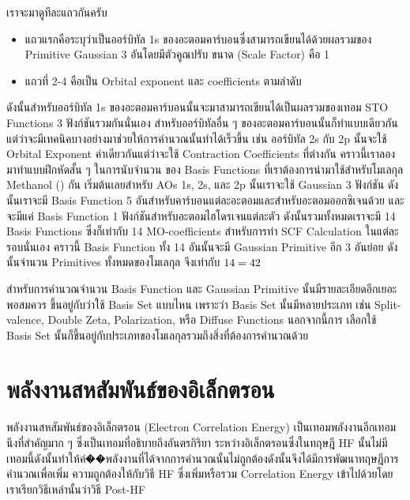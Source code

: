 เราจะมาดูทีละแถวกันครับ

\begin{itemize}[topsep=0pt,noitemsep]
  \setlength\itemsep{1em}
  \item แถวแรกคือระบุว่าเป็นออร์บิทัล 1s ของอะตอมคาร์บอนซึ่งสามารถเขียนได้ด้วยผลรวมของ Primitive Gaussian 3 อันโดยมีตัวคูณปรับ%
        ขนาด (Scale Factor) คือ 1

  \item แถวที่ 2-4 คือเป็น Orbital exponent และ  coefficients ตามลำดับ
\end{itemize}

\noindent ดังนั้นสำหรับออร์บิทัล 1s ของอะตอมคาร์บอนนั้นจะมาสามารถเขียนได้เป็นผลรวมของเทอม STO Functions 3 ฟังก์ชันรวมกันนั่นเอง
สำหรับออร์บิทัลอื่น ๆ ของอะตอมคาร์บอนนั้นก็ทำแบบเดียวกันแต่ว่าจะมีเทคนิคบางอย่างมาช่วยให้การคำนวณนั้นทำได้เร็วขึ้น เช่น ออร์บิทัล 2s กับ 2p
นั้นจะใช้ Orbital Exponent ค่าเดียวกันแต่ว่าจะใช้ Contraction Coefficients ที่ต่างกัน คราวนี้เราลองมาทำแบบฝึกหัดสั้น ๆ ในการนับจำนวน%
ของ Basis Functions ที่เราต้องการนำมาใช้สำหรับโมเลกุล Methanol () กัน เริ่มต้นเลยสำหรับ AOs 1s, 2s, และ 2p นั้นเราจะใช้
Gaussian 3 ฟังก์ชัน ดังนั้นเราจะมี Basis Function 5 อันสำหรับคาร์บอนแต่ละอะตอมและสำหรับอะตอมออกซิเจนด้วย และจะมีแค่ Basis Function
1 ฟังก์ชันสำหรับอะตอมไฮโดรเจนแต่ละตัว ดังนั้นรวมทั้งหมดเราจะมี 14 Basis Functions ซึ่งก็เท่ากับ 14 MO-coefficients สำหรับการทำ SCF
Calculation ในแต่ละรอบนั่นเอง คราวนี้ Basis Function ทั้ง 14 อันนั้นจะมี Gaussian Primitive อีก 3 อันย่อย ดังนั้นจำนวน Primitives
ทั้งหมดของโมเลกุล  จึงเท่ากับ $14 \time 3 = 42$

สำหรับการคำนวณจำนวน Basis Function และ Gaussian Primitive นั้นมีรายละเอียดอีกเยอะพอสมควร ขึ้นอยู่กับว่าใช้ Basis Set แบบไหน
เพราะว่า Basis Set นั้นมีหลายประเภท เช่น Split-valence, Double Zeta, Polarization, หรือ Diffuse Functions นอกจากนี้การ%
เลือกใช้ Basis Set นั้นก็ขึ้นอยู่กับประเภทของโมเลกุลรวมถึงสิ่งที่ต้องการคำนวณด้วย

\section{พลังงานสหสัมพันธ์ของอิเล็กตรอน}

พลังงานสหสัมพันธ์ของอิเล็กตรอน (Electron Correlation Energy) เป็นเทอมพลังงานอีกเทอมนึงที่สำคัญมาก ๆ ซึ่งเป็นเทอมที่อธิบายถึงอันตรกิริยา%
ระหว่างอิเล็กตรอนซึ่งในทฤษฎี HF นั้นไม่มีเทอมนี้ดังนั้นทำให้ค่��พลังงานที่ได้จากการคำนวณนั้นไม่ถูกต้องดังนั้นจึงได้มีการพัฒนาทฤษฎีการคำนวณเพื่อเพิ่ม%
ความถูกต้องให้กับวิธี HF ซึ่งเพิ่มหรือรวม Correlation Energy เข้าไปด้วยโดยเราเรียกวิธีเหล่านั้นว่าวิธี Post-HF

